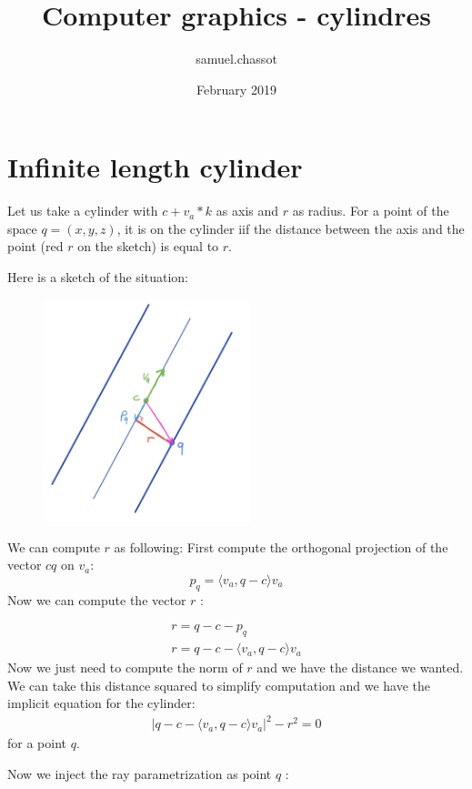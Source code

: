 \documentclass{article}
\title{Computer graphics - cylindres}
\author{samuel.chassot }
\date{February 2019}
\begin{document}
\maketitle

\section{Infinite length cylinder}
Let us take a cylinder with $c + v_a*k$ as axis and $r$ as radius. For a point of the space $q = (x,y,z)$, it is on the cylinder iif the distance between the axis and the point (red $r$ on the sketch) is equal to $r$.

Here is a sketch of the situation:
\begin{figure}[h]
\centering
\includegraphics[width=6cm]{res/Cylinder_sketch.jpeg}
\end{figure}

We can compute $r$ as following:
First compute the orthogonal projection of the vector $c q$ on $v_a$:
$$p_q = \langle v_a, q-c\rangle  v_a$$
Now we can compute the vector $r$ :

\begin{gather*}
    r = q-c-p_q \\
    r = q-c - \langle v_a, q-c\rangle  v_a
\end{gather*}
Now we just need to compute the norm of $r$ and we have the distance we wanted. We can take this distance squared to simplify computation and we have the implicit equation for the cylinder:
\begin{gather*}
    |q-c-\langle v_a, q-c\rangle  v_a|^2 -r^2 = 0
\end{gather*}
for a point $q$.

Now we inject the ray parametrization as point $q$ :
\end{document}
